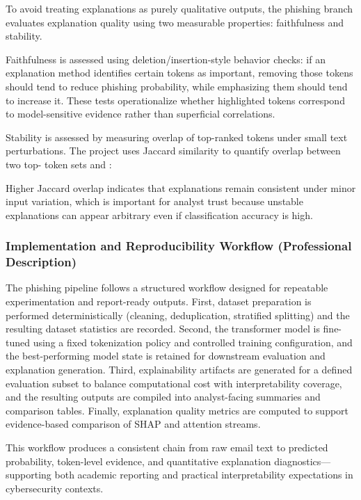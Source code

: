 \documentclass[conference]{IEEEtran}
\begin{document}
To avoid treating explanations as purely qualitative outputs, the phishing branch evaluates explanation quality using two measurable properties: faithfulness and stability.

Faithfulness is assessed using deletion/insertion-style behavior checks: if an explanation method identifies certain tokens as important, removing those tokens should tend to reduce phishing probability, while emphasizing them should tend to increase it. These tests operationalize whether highlighted tokens correspond to model-sensitive evidence rather than superficial correlations.

Stability is assessed by measuring overlap of top-ranked tokens under small text perturbations. The project uses Jaccard similarity to quantify overlap between two top- token sets and :

Higher Jaccard overlap indicates that explanations remain consistent under minor input variation, which is important for analyst trust because unstable explanations can appear arbitrary even if classification accuracy is high.

\subsubsection{Implementation and Reproducibility Workflow (Professional Description)}

The phishing pipeline follows a structured workflow designed for repeatable experimentation and report-ready outputs. First, dataset preparation is performed deterministically (cleaning, deduplication, stratified splitting) and the resulting dataset statistics are recorded. Second, the transformer model is fine-tuned using a fixed tokenization policy and controlled training configuration, and the best-performing model state is retained for downstream evaluation and explanation generation. Third, explainability artifacts are generated for a defined evaluation subset to balance computational cost with interpretability coverage, and the resulting outputs are compiled into analyst-facing summaries and comparison tables. Finally, explanation quality metrics are computed to support evidence-based comparison of SHAP and attention streams.

This workflow produces a consistent chain from raw email text to predicted probability, token-level evidence, and quantitative explanation diagnostics---supporting both academic reporting and practical interpretability expectations in cybersecurity contexts.
\end{document}
